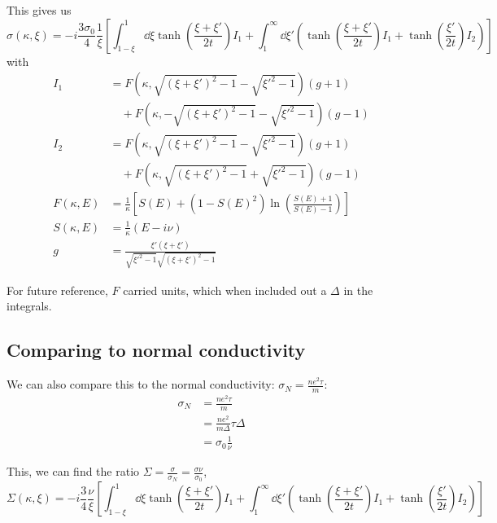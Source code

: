 \documentclass[../../main.tex]{subfiles}
\begin{document}
This gives us 
\begin{equation}
\sigma(\kappa, \xi) = -i \frac{3 \sigma_0}{4} \frac{1}{\xi}\left[\int_{1 - \xi}^{1}\dd{\xi} \tanh(\frac{\xi + \xi'}{2 t}) I_1 + \int_{1}^{\infty} \dd{\xi'} \left( \tanh(\frac{\xi + \xi'}{2t}) I_1  + \tanh(\frac{\xi'}{2t})I_2 \right) \right]
\end{equation}
with 
\begin{align}
I_1 &= F(\kappa, \sqrt{(\xi + \xi')^2 - 1} - \sqrt{\xi'^2 - 1}) (g + 1) \nonumber\\
&\quad + F(\kappa, -\sqrt{(\xi + \xi')^2 - 1} - \sqrt{\xi'^2 - 1}) (g - 1) \\
I_2 &= F(\kappa, \sqrt{(\xi + \xi')^2 - 1} - \sqrt{\xi'^2 - 1}) (g + 1) \nonumber\\
&\quad + F(\kappa, \sqrt{(\xi + \xi')^2 - 1} + \sqrt{\xi'^2 - 1}) (g - 1) \\	
F(\kappa, E) &= \frac{1}{\kappa} \left[S(E) + (1 - S(E)^2)\ln(\frac{S(E) + 1}{S(E) - 1})\right]  \\
S(\kappa, E) &= \frac{1}{\kappa} \left(E - i \nu \right) \\
g  &= \frac{\xi' \left( \xi + \xi'\right)}{\sqrt{\xi'^2 - 1}\sqrt{(\xi + \xi')^2 - 1}}
\end{align}

For future reference, $F$ carried units, which when included out a $\Delta$ in the integrals.

\subsection{Comparing to normal conductivity}
We can also compare this to the normal conductivity: $\sigma_N = \frac{n e^2 \tau}{m}$:
\begin{align}
\sigma_N &= \frac{n e^2 \tau}{m} \\
&= \frac{n e^2}{m \Delta} \tau \Delta \\
&= \sigma_0 \frac{1}{\nu}
\end{align}

This, we can find the ratio $\Sigma = \frac{\sigma}{\sigma_N} = \frac{\sigma \nu}{\sigma_0}$,
\begin{equation}
\Sigma(\kappa, \xi) = -i \frac{3}{4} \frac{\nu}{\xi}\left[\int_{1 - \xi}^{1}\dd{\xi} \tanh(\frac{\xi + \xi'}{2 t}) I_1 + \int_{1}^{\infty} \dd{\xi'} \left( \tanh(\frac{\xi + \xi'}{2t}) I_1  + \tanh(\frac{\xi'}{2t})I_2 \right) \right]
\end{equation}
\end{document}
